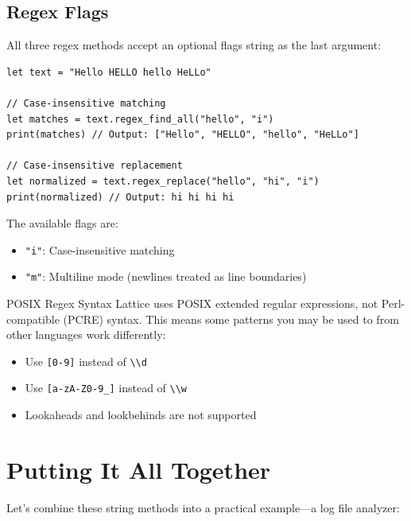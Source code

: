 \subsection{Regex Flags}\label{sec:regex-flags}

All three regex methods accept an optional flags string as the last argument:

\begin{lstlisting}[language=Lattice, caption={Case-insensitive regex}]
let text = "Hello HELLO hello HeLLo"

// Case-insensitive matching
let matches = text.regex_find_all("hello", "i")
print(matches) // Output: ["Hello", "HELLO", "hello", "HeLLo"]

// Case-insensitive replacement
let normalized = text.regex_replace("hello", "hi", "i")
print(normalized) // Output: hi hi hi hi
\end{lstlisting}

The available flags are:
\begin{itemize}
  \item \lstinline|"i"|: Case-insensitive matching
  \item \lstinline|"m"|: Multiline mode (newlines treated as line boundaries)
\end{itemize}

\begin{warnbox}{POSIX Regex Syntax}
Lattice uses POSIX extended regular expressions, not Perl-compatible (PCRE) syntax. This means some patterns you may be used to from other languages work differently:
\begin{itemize}
  \item Use \lstinline|[0-9]| instead of \lstinline|\\d|
  \item Use \lstinline|[a-zA-Z0-9_]| instead of \lstinline|\\w|
  \item Lookaheads and lookbehinds are not supported
\end{itemize}
\end{warnbox}

\section{Putting It All Together}\label{sec:strings-together}

Let's combine these string methods into a practical example---a log file analyzer:

